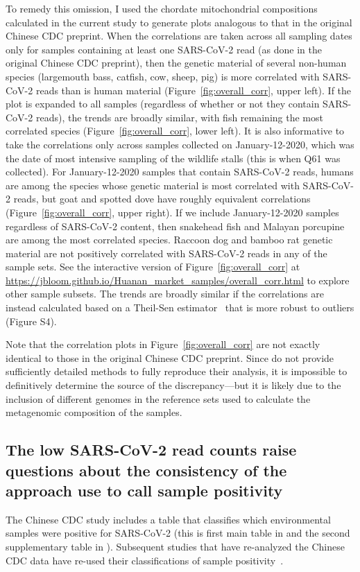 \documentclass[9pt,twocolumn,twoside]{gsajnl_modified}
\begin{document}
To remedy this omission, I used the chordate mitochondrial compositions calculated in the current study to generate plots analogous to that in the original Chinese CDC preprint.
When the correlations are taken across all sampling dates only for samples containing at least one SARS-CoV-2 read (as done in the original Chinese CDC preprint), then the genetic material of several non-human species (largemouth bass, catfish, cow, sheep, pig) is more correlated with SARS-CoV-2 reads than is human material (Figure~\ref{fig:overall_corr}, upper left).
If the plot is expanded to all samples (regardless of whether or not they contain SARS-CoV-2 reads), the trends are broadly similar, with fish remaining the most correlated species (Figure~\ref{fig:overall_corr}, lower left).
It is also informative to take the correlations only across samples collected on January-12-2020, which was the date of most intensive sampling of the wildlife stalls (this is when Q61 was collected).
 For January-12-2020 samples that contain SARS-CoV-2 reads, humans are among the species whose genetic material is most correlated with SARS-CoV-2 reads, but goat and spotted dove have roughly equivalent correlations (Figure~\ref{fig:overall_corr}, upper right).
 If we include January-12-2020 samples regardless of SARS-CoV-2 content, then snakehead fish and Malayan porcupine are among the most correlated species.
Raccoon dog and bamboo rat genetic material are not positively correlated with SARS-CoV-2 reads in any of the sample sets.
See the interactive version of Figure~\ref{fig:overall_corr} at \url{https://jbloom.github.io/Huanan_market_samples/overall_corr.html} to explore other sample subsets.
The trends are broadly similar if the correlations are instead calculated based on a Theil-Sen estimator~\citep{theilsen} that is more robust to outliers (Figure S4).

Note that the correlation plots in Figure~\ref{fig:overall_corr} are not exactly identical to those in the original Chinese CDC preprint.
Since \citet{liu2022surveillance} do not provide sufficiently detailed methods to fully reproduce their analysis, it is impossible to definitively determine the source of the discrepancy---but it is likely due to the inclusion of different genomes in the reference sets used to calculate the metagenomic composition of the samples.

\subsection{The low SARS-CoV-2 read counts raise questions about the consistency of the approach use to call sample positivity}
The Chinese CDC study includes a table that classifies which environmental samples were positive for SARS-CoV-2 (this is first main table in \citet{liu2022surveillance} and the second supplementary table in \citet{liu2023surveillance}).
Subsequent studies that have re-analyzed the Chinese CDC data have re-used their classifications of sample positivity~\citep{worobey2022huanan,courtier2022sars,crits2023genetic}.
\end{document}
